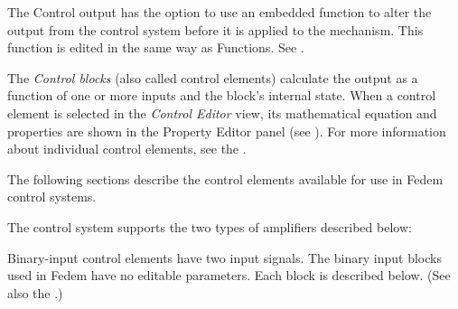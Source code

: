 The Control output has the option to use an embedded function to alter the
output from the control system before it is applied to the mechanism.
This function is edited in the same way as Functions.
See .



The {\sl Control blocks} (also called control elements) calculate the output as
a function of one or more inputs and the block's internal state.
When a control element is selected in the {\sl Control Editor} view,
its mathematical equation and properties are shown in the Property Editor panel
(see ).
For more information about individual control elements,
see the .

The following sections describe the control elements available for use in
Fedem control systems.



The control system supports the two types of amplifiers described below:

\bigskip{}

\bigskip{}



Binary-input control elements have two input signals.
The binary input blocks used in Fedem have no editable parameters.
Each block is described below.
(See also the .)

\medskip{}

\medskip{}

\medskip{}



